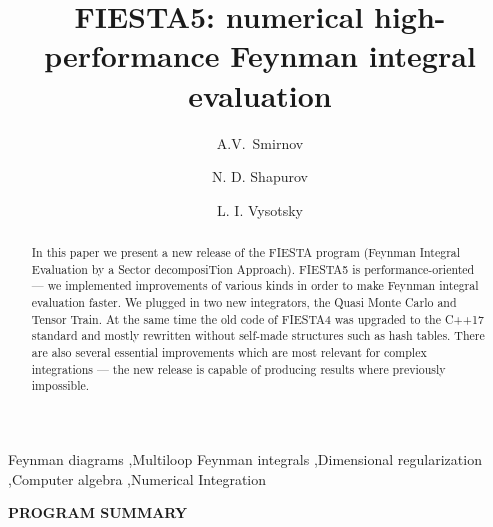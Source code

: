 \documentclass[preprint,12pt]{elsarticle}
\begin{document}
\begin{frontmatter}

\title{FIESTA5: numerical high-performance Feynman integral evaluation}

\author[SRCC,MC]{A.V.~Smirnov}

\author[CS,MC]{N. D. Shapurov}

\author[CS,MC]{L. I. Vysotsky}


\address[SRCC]{Research Computing Center, Moscow State University, Moscow, Russia}
\address[CS]{Faculty of Computational Mathematics and Cybernetics, Moscow State University, Moscow, Russia}
\address[MC]{Moscow Center for Fundamental and Applied Mathematics, Moscow, Russia}


\begin{abstract}
In this paper we present a new release of the FIESTA program (Feynman Integral Evaluation by a Sector decomposiTion Approach). FIESTA5 is performance-oriented --- we implemented improvements of various kinds in order to make Feynman integral evaluation faster. We plugged in two new integrators, the Quasi Monte Carlo and Tensor Train. At the same time the old code of FIESTA4 was upgraded to the C++17 standard and 
mostly rewritten without self-made structures such as hash tables. There are also several essential improvements which are most relevant for complex integrations --- the new release is capable of producing results where previously impossible.
\end{abstract}
\begin{keyword}
Feynman diagrams \sep Multiloop Feynman integrals \sep Dimensional regularization \sep Computer algebra \sep Numerical Integration
\end{keyword}
\end{frontmatter}
\newpage



{\bf PROGRAM SUMMARY}

\vspace{1cm}
\end{document}
